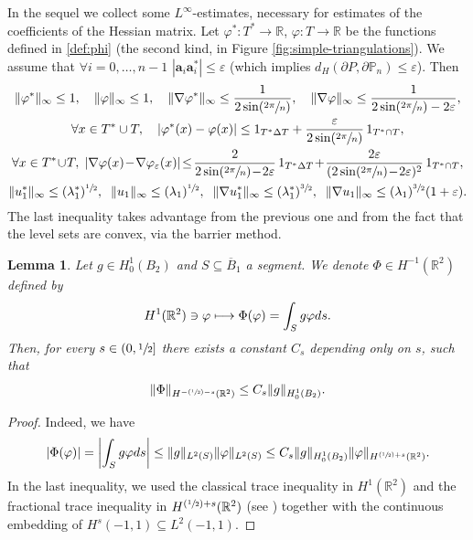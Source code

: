 \documentclass[JEP,XML,SOM,Unicode,ThmDefs,NoFloatCountersInSection,published]{cedram}
\let\ra\to
\def\mto{\mathchoice{\longmapsto}{\mapsto}{\mapsto}{\mapsto}}
\newcommand{\Psfrac}[2]{(\sfrac{#1}{#2})}
\theoremstyle{plain}
\newtheorem{lemma}[thm]{Lemma}
\theoremstyle{definition}
\newcommand{\bo}[1]{{\boldsymbol#1}}
\let\Bbb\mathbb
\def\R{\mathbb{R}}
\newcommand{\vps}{\varepsilon}
\newcommand{\vphi}{\varphi}
\newcommand{\lb}{\lambda}
\newcommand{\sq}{\subseteq}
\newcommand{\ov}{\overline}
\begin{document}
In the sequel we collect some $L^\infty$-estimates, necessary for estimates of the coefficients of the Hessian matrix.
Let $\vphi^*: T^*\ra \R$, $ \vphi: T \ra \R$ be the functions defined in \eqref{def:phi} (the second kind, in Figure \ref{fig:simple-triangulations}). We assume that $\forall i=0, \dots, n-1$ $|\bo a_i\bo a_i^*|\le \vps$ (which implies $d_H(\partial P, \partial \Bbb P_n) \le \vps$). Then
\begin{gather*}
\|\vphi^*\|_\infty \le 1,\quad \|\vphi\|_\infty \le 1,\quad \|\nabla \vphi^*\|_\infty \le \frac{1}{2 \sin \Psfrac{ {2}\pi}{n}},\quad \|\nabla \vphi\|_\infty \le \frac{1}{2\sin \Psfrac{ {2}\pi}{n}-2\vps},
\\
\forall x\in T^*\cup T,\quad |\vphi^*(x)-\vphi (x)|\le 1_{T^*\Delta T} + \frac{\vps}{2 \sin \Psfrac{ {2}\pi}{n}}\, 1_{T^*\cap T},
\\
\forall x\in T^*\!\cup\! T,\; |\nabla \vphi(x)\!-\!\nabla \vphi_\vps (x)|\!\le\! \frac{2}{2\sin \Psfrac{ {2}\pi}{n}\!-\!2\vps}\,1_{T^*\Delta T} \!+\! \frac{2\vps}{(2 \sin \Psfrac{ {2}\pi}{n}\!-\!2\vps)^2}\,1_{T^*\cap T },
\\
\|u_1^*\|_\infty \le(\lb_1^*)^{\sfrac 12}, \;\; \|u_1 \|_\infty \le (\lb_1)^{\sfrac 12},
\;\;
\|\nabla u_1^*\|_\infty \le (\lb_1^*)^{\sfrac 32}, \;\; \|\nabla u_1 \|_\infty \le (\lb_1)^{\sfrac 32} (1+\vps).
\end{gather*}
The last inequality takes advantage from the previous one and from the fact that the level sets are convex, via the barrier method.

\begin{lemma}\label{bobu26}
Let $g \in H^1_0(B_2)$ and $S \sq \ov B_1$ a segment. We denote $\Phi \in H^{-1} (\R^2)$ defined by\enlargethispage{-2\baselineskip}
\[
H^1(\R^2) \ni \vphi \mto \Phi (\vphi) = \int_S g \vphi ds.
\]
Then, for every $s \in (0, \sfrac 12]$ there exists a constant $C_s$ depending only on $s$, such that
\[
\|\Phi\|_{H^{-\Psfrac 12-s}(\R^2)} \le C_s \|g\|_{H^1_0(B_2)}.
\]
\end{lemma}
\begin{proof}
Indeed, we have
\[
|\Phi (\vphi)| = \left|\int_S g \vphi ds\right|\le \|g\|_{L^2(S)} \|\vphi\|_{L^2(S)}
\le C_s \|g\|_{H^1_0(B_2)} \|\vphi \|_{H^{ \Psfrac 12+s}(\R^2)}.
\]
In the last inequality, we used the classical trace inequality in $H^1(\R^2)$ and the fractional trace inequality in $H^{ \Psfrac 12+s}(\R^2)$ (see \cite[Lem.\,16.1]{Ta07}) together with the continuous embedding of $H^s(-1,1) \sq L^2(-1,1)$.
\end{proof}
\end{document}
